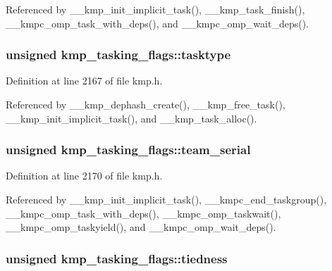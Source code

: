 Referenced by \-\_\-\-\_\-kmp\-\_\-init\-\_\-implicit\-\_\-task(), \-\_\-\-\_\-kmp\-\_\-task\-\_\-finish(), \-\_\-\-\_\-kmpc\-\_\-omp\-\_\-task\-\_\-with\-\_\-deps(), and \-\_\-\-\_\-kmpc\-\_\-omp\-\_\-wait\-\_\-deps().

\hypertarget{structkmp__tasking__flags_ac102ec6051f4b30f0e81c0f3b5d9e84a}{
\subsubsection[{tasktype}]{\setlength{\rightskip}{0pt plus 5cm}unsigned kmp\-\_\-tasking\-\_\-flags\-::tasktype}}\label{structkmp__tasking__flags_ac102ec6051f4b30f0e81c0f3b5d9e84a}


Definition at line 2167 of file kmp.\-h.



Referenced by \-\_\-\-\_\-kmp\-\_\-dephash\-\_\-create(), \-\_\-\-\_\-kmp\-\_\-free\-\_\-task(), \-\_\-\-\_\-kmp\-\_\-init\-\_\-implicit\-\_\-task(), and \-\_\-\-\_\-kmp\-\_\-task\-\_\-alloc().

\hypertarget{structkmp__tasking__flags_a69abf7c2ecf0b7284861a90c7ac0cfe1}{
\subsubsection[{team\-\_\-serial}]{\setlength{\rightskip}{0pt plus 5cm}unsigned kmp\-\_\-tasking\-\_\-flags\-::team\-\_\-serial}}\label{structkmp__tasking__flags_a69abf7c2ecf0b7284861a90c7ac0cfe1}


Definition at line 2170 of file kmp.\-h.



Referenced by \-\_\-\-\_\-kmp\-\_\-init\-\_\-implicit\-\_\-task(), \-\_\-\-\_\-kmpc\-\_\-end\-\_\-taskgroup(), \-\_\-\-\_\-kmpc\-\_\-omp\-\_\-task\-\_\-with\-\_\-deps(), \-\_\-\-\_\-kmpc\-\_\-omp\-\_\-taskwait(), \-\_\-\-\_\-kmpc\-\_\-omp\-\_\-taskyield(), and \-\_\-\-\_\-kmpc\-\_\-omp\-\_\-wait\-\_\-deps().

\hypertarget{structkmp__tasking__flags_a896a40bab626e74a4824539d1605d176}{
\subsubsection[{tiedness}]{\setlength{\rightskip}{0pt plus 5cm}unsigned kmp\-\_\-tasking\-\_\-flags\-::tiedness}}\label{structkmp__tasking__flags_a896a40bab626e74a4824539d1605d176}


